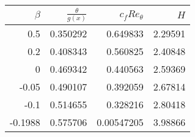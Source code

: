 \begin{tabular}{rrrr}
\hline
   $\beta$ &   $\frac{\theta}{g(x)}$ &   $c_f Re_{\theta}$ &     $H$ \\
\hline
    0.5    &                0.350292 &          0.649833   & 2.29591 \\
    0.2    &                0.408343 &          0.560825   & 2.40848 \\
    0      &                0.469342 &          0.440563   & 2.59369 \\
   -0.05   &                0.490107 &          0.392059   & 2.67814 \\
   -0.1    &                0.514655 &          0.328216   & 2.80418 \\
   -0.1988 &                0.575706 &          0.00547205 & 3.98866 \\
\hline
\end{tabular}